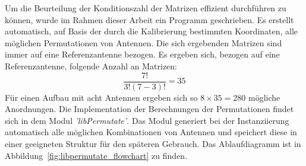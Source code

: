 %

%
Um die Beurteilung der Konditionszahl der Matrizen effizient durchführen zu können, wurde im Rahmen dieser Arbeit ein Programm geschrieben. Es erstellt automatisch, auf Basis der durch die Kalibrierung bestimmten Koordinaten, alle möglichen Permutationen von Antennen. Die sich ergebenden Matrizen sind immer auf eine Referenzantenne bezogen. Es ergeben sich, bezogen auf eine Referenzantenne, folgende Anzahl an Matrizen:
% 
\begin{equation}
	\frac{7!}{3!(7-3)!}=35
% 
\end{equation}
%
Für einen Aufbau mit acht Antennen ergeben sich so $8\times 35 = 280$ mögliche Anordnungen. Die Implementation der Berechnungen der Permutationen findet sich in dem Modul \textit{'libPermutate'}. Das Modul generiert bei der Instanziierung automatisch alle möglichen Kombinationen von Antennen und speichert diese in einer geeigneten Struktur für den späteren Gebrauch. Das Ablaufdiagramm ist in Abbildung~\ref{fig:libpermutate_flowchart} zu finden.\\
%



